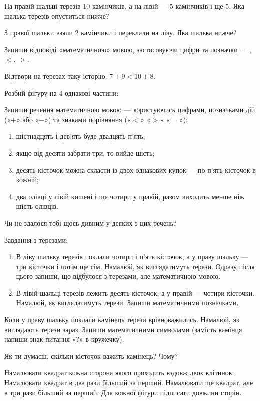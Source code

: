 \problem
На правій шальці терезів 10 камінчиків, а на лівій --- 5 камінчиків і ще 5.
Яка шалька терезів опуститься нижче?

З правої шальки взяли 2 камінчики і переклали на ліву.
Яка шалька нижче?

Запиши відповіді «математичною» мовою, застосовуючи цифри
та позначки $=$, $<$, $>$.


\problem
Відтвори на терезах таку історію: $7+9 < 10+8$.


\problem
Розбий фігуру на 4 однакові частини:


\problem
Запиши речення математичною мовою --- користуючись цифрами,
позначками дій («$+$» або «$-$») та знаками порівняння («$<$» «$>$» «$=$»):
\begin{enumerate}
    \item шістнадцять і дев'ять буде двадцять п'ять;
    \item якщо від десяти забрати три, то вийде шість;
    \item десять кісточок можна скласти із двох однакових купок --- 
    по п'ять кісточок в кожній;
    \item два олівці у лівій кишені і ще чотири у правій,
    разом виходить менше ніж шість олівців.
\end{enumerate}
Чи не здалося тобі щось дивним у деяких з цих речень?

\problem
Завдання з терезами:
\begin{enumerate}
    \item В ліву шальку терезів поклали чотири і п'ять кісточок,
    а у праву шальку --- три кісточки і потім ще сім.
    Намалюй, як виглядатимуть терези.
    Одразу після цього запиши, що відбулося з терезами,
    але математичною мовою.
    \item В лівій шальці терезів лежить десять кісточок,
    а у правій --- чотири кісточки.
    Намалюй, як виглядатимуть терези. Запиши математичними позначками.
\end{enumerate}

Коли у праву шальку поклали камінець терези врівноважились.
Намалюй, як виглядають терези зараз.
Запиши математичними символами
(замість камінця напиши знак питання «?» в кружечку).

Як ти думаєш, скільки кісточок важить камінець? Чому?


\problem
Намалювати квадрат кожна сторона якого проходить вздовж двох клітинок.
Намалювати квадрат в два рази більший за перший.
Намалювати ще квадрат, але в три рази більший за перший.
Для кожної фігури підписати довжини сторін.


